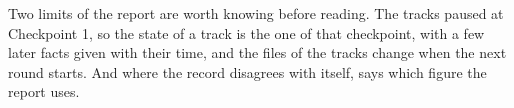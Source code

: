 \begin{preface}
Two limits of the report are worth knowing before reading. The tracks paused at
Checkpoint 1, so the state of a track is the one of that checkpoint, with a few later
facts given with their time, and the files of the tracks change when the next round
starts. And where the record disagrees with itself,  says which
figure the report uses.
\end{preface}
